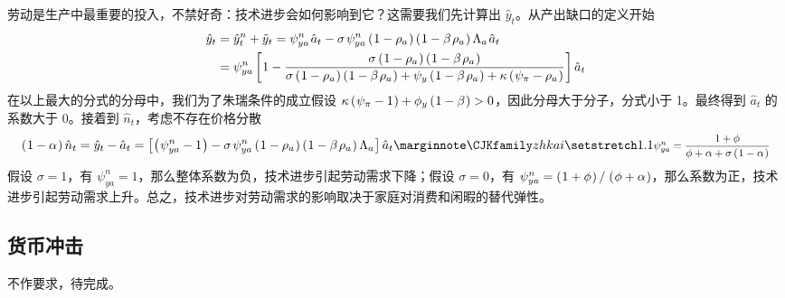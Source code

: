 劳动是生产中最重要的投入，不禁好奇：技术进步会如何影响到它？这需要我们先计算出 \(\hat y_t\)。从产出缺口的定义开始
\begin{align*}
    \hat y_t &= \hat y_t^n+\tilde y_t=\psi^n_{ya}\,\hat a_t-\sigma\,\psi^n_{ya}\bka{1-\rho_a}\bka{1-\beta\,\rho_a}\Lambda_a\,\hat a_t\\
    &=\psi^n_{ya}\bks{1-\dfrac{\sigma\bka{1-\rho_a}\bka{1-\beta\,\rho_a}}{\sigma\bka{1-\rho_a}\bka{1-\beta\,\rho_a}+\psi_y\bka{1-\beta\,\rho_a}+\kappa\bka{\psi_\pi-\rho_a}}}\hat a_t
\end{align*}
在以上最大的分式的分母中，我们为了朱瑞条件的成立假设 \(\kappa\left(\mspace{1mu}\psi_\pi-1\mspace{1mu}\right)+\phi_y\left(\mspace{1mu}1-\beta\mspace{1mu}\right)>0\)，因此分母大于分子，分式小于 1。最终得到 \(\hat a_t\) 的系数大于 0。接着到 \(\hat n_t\)，考虑不存在价格分散
\begin{align*}
    \bka{1-\alpha}\hat n_t=\hat y_t-\hat a_t=\bks{\bka{\psi^n_{ya}-1}-\sigma\,\psi^n_{ya}\bka{1-\rho_a}\bka{1-\beta\,\rho_a}\Lambda_a}\hat a_t\sidenote{\sidemath{\(\psi_{ya}^n=\dfrac{1+\phi}{\phi+\alpha+\sigma\bka{1-\alpha}}\)}}
\end{align*}
假设 \(\sigma=1\)，有 \(\psi^n_{ya}=1\)，那么整体系数为负，技术进步引起劳动需求下降；假设 \(\sigma=0\)，有 \(\psi^n_{ya}=\bka{1+\phi}/\,\bka{\phi+\alpha}\)，那么系数为正，技术进步引起劳动需求上升。总之，技术进步对劳动需求的影响取决于家庭对消费和闲暇的替代弹性。

\subsection{货币冲击}

不作要求，待完成。




\SymmetricGeometry

